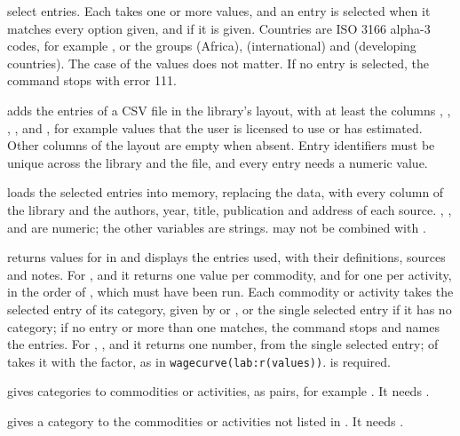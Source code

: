 \begin{optdesc}
\item[\optarg{c}{ountry}{codes}, \optarg{cat}{egory}{names},
\optarg{sou}{rce}{ids} and \optarg{}{id}{ids}] select entries. Each takes one
or more values, and an entry is selected when it matches every option given,
and  if it is given. Countries are ISO 3166 alpha-3 codes, for
example , or the groups  (Africa),  (international)
and  (developing countries). The case of the values does not matter.
If no entry is selected, the command stops with error 111.

\item[\cmd{using} \argu{filename}] adds the entries of a CSV file in the
library's layout, with at least the columns , ,
, ,  and , for example values
that the user is licensed to use or has estimated. Other columns of the layout
are empty when absent. Entry identifiers must be unique across the library and
the file, and every entry needs a numeric value.

\item[\opt{}{clear}] loads the selected entries into memory, replacing the
data, with every column of the library and the authors, year, title,
publication and address of each source. , ,  and
 are numeric; the other variables are strings.  may not
be combined with .

\item[\opt{val}{ues}] returns values for  in
 and displays the entries used, with their definitions, sources
and notes. For ,  and  it returns one value
per commodity, and for  one per activity, in the order of
, which must have been run. Each commodity or activity takes
the selected entry of its category, given by  or , or
the single selected entry if it has no category; if no entry or more than one
matches, the command stops and names the entries. For ,
,  and  it returns one number, from
the single selected entry;  of  takes it
with the factor, as in
\texttt{wagecurve(lab:\textasciigrave r(values)\textquotesingle)}.  is
required.

\item[\optarg{}{map}{spec}] gives categories to commodities or activities, as
\cmd{:} pairs, for example
. It needs .

\item[\optarg{oth}{ers}{category}] gives a category to the commodities or
activities not listed in . It needs .
\end{optdesc}

